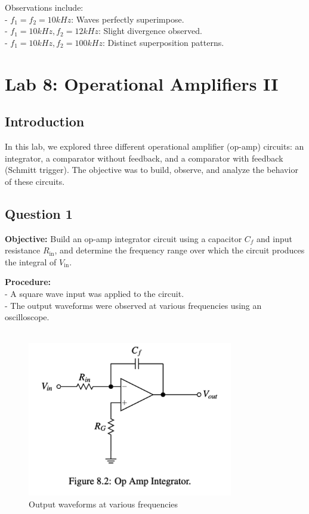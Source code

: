 \documentclass{article}
\begin{document}
Observations include: \\ 
- \( f_1 = f_2 = 10kHz \): Waves perfectly superimpose. \\ 
- \( f_1 = 10kHz, f_2 = 12kHz \): Slight divergence observed.\\
- \( f_1 = 10kHz, f_2 = 100kHz \): Distinct superposition patterns. \\





\section*{Lab 8: Operational Amplifiers II}

\subsection*{Introduction}
In this lab, we explored three different operational amplifier (op-amp) 
circuits: an integrator, a comparator without feedback, and a comparator 
with feedback (Schmitt trigger). The objective was to build, observe, and 
analyze the behavior of these circuits.

\subsection*{Question 1}
\textbf{Objective:} Build an op-amp integrator circuit using a 
capacitor \( C_f \) and input resistance \( R_{\text{in}} \), 
and determine the frequency range over which the circuit produces 
the integral of \( V_{\text{in}} \).

\textbf{Procedure:} \\ 
- A square wave input was applied to the circuit. \\ 
- The output waveforms were observed at various frequencies using an oscilloscope. \\ 
\\ 

\begin{figure}[H]
    \centering
    \includegraphics[width=0.8\textwidth]{img/Lab 8/1_1.png} %
    \caption{Output waveforms at various frequencies}
\end{figure}
\end{document}
